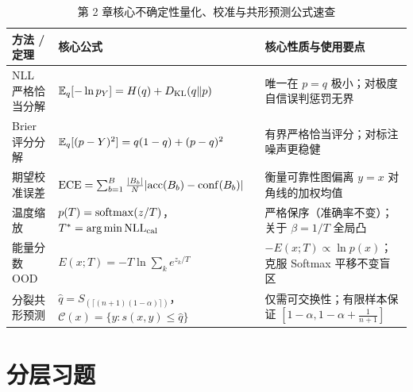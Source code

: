 \begin{table}[htbp]
  \centering
  \caption{第 2 章核心不确定性量化、校准与共形预测公式速查}
  \label{tab:ch2-summary}
  \footnotesize
  \begin{tabularx}{\linewidth}{@{}p{34mm}p{58mm}X@{}}
    \toprule
    \textbf{方法 / 定理} & \textbf{核心公式} & \textbf{核心性质与使用要点} \\
    \midrule
    NLL 严格恰当分解 & $\mathbb{E}_q[-\ln p_Y] = H(q) + D_{\mathrm{KL}}(q\|p)$ & 唯一在 $p=q$ 极小；对极度自信误判惩罚无界 \\
    Brier 评分分解 & $\mathbb{E}_q[(p-Y)^2] = q(1-q) + (p-q)^2$ & 有界严格恰当评分；对标注噪声更稳健 \\
    期望校准误差 & $\operatorname{ECE} = \sum_{b=1}^B \frac{|B_b|}{N}|\mathrm{acc}(B_b)-\mathrm{conf}(B_b)|$ & 衡量可靠性图偏离 $y=x$ 对角线的加权均值 \\
    温度缩放 & $p(T) = \operatorname{softmax}(z/T)$，$T^* = \operatorname*{arg\,min} \mathrm{NLL}_{\text{cal}}$ & 严格保序（准确率不变）；关于 $\beta=1/T$ 全局凸 \\
    能量分数 OOD & $E(x;T) = -T\ln\sum_k e^{z_k/T}$ & $-E(x;T) \propto \ln p(x)$；克服 Softmax 平移不变盲区 \\
    分裂共形预测 & $\hat{q} = S_{(\lceil(n+1)(1-\alpha)\rceil)}$，$\mathcal{C}(x)=\{y:s(x,y)\le\hat{q}\}$ & 仅需可交换性；有限样本保证 $[1-\alpha, 1-\alpha+\frac{1}{n+1}]$ \\
    \bottomrule
  \end{tabularx}
\end{table}

\section{分层习题}


